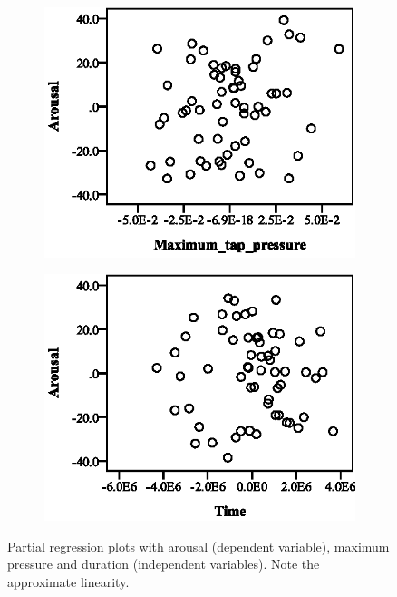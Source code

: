 \begin{figure}[ht]
  \centering
  \begin{subfigure}[b]{0.45\textwidth}
    \centering
    \includegraphics[width=\textwidth]{images/linearity/partialregression/arousal/ArMaxMax.eps}
    \label{fig:armaxmax}
  \end{subfigure}
  \quad
  \begin{subfigure}[b]{0.45\textwidth}
    \centering
    \includegraphics[width=\textwidth]{images/linearity/partialregression/arousal/ArMaxTime.eps}
    \label{fig:armaxtime}
  \end{subfigure}
  \caption{Partial regression plots with arousal (dependent variable), maximum pressure and duration (independent variables). Note the approximate linearity.}
\end{figure}


